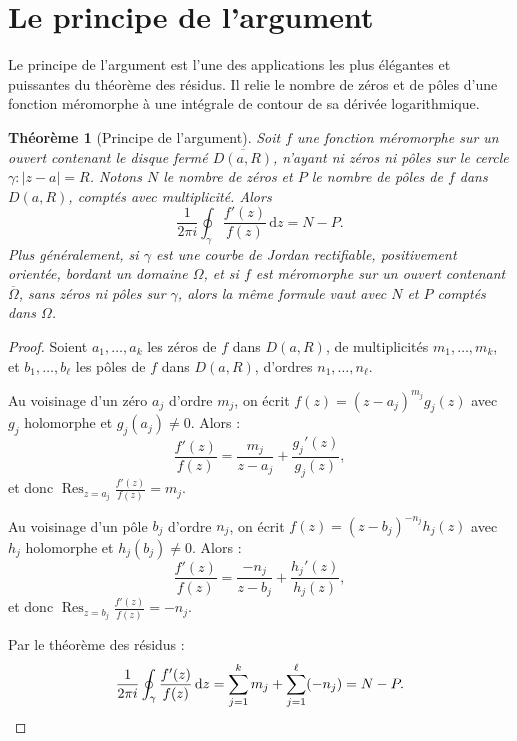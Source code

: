 \documentclass[12pt,a4paper,openany]{book}
\theoremstyle{definition}
\theoremstyle{plain}
\newtheorem{theoreme}[definition]{Théorème}
\theoremstyle{remark}
\DeclareMathOperator{\Res}{Res}
\newcommand{\dd}{\mathrm{d}}
\newcommand{\abs}[1]{\left|#1\right|}
\begin{document}
\section{Le principe de l'argument}\label{sec:principe-argument}

Le principe de l'argument est l'une des applications les plus élégantes et
puissantes du théorème des résidus. Il relie le nombre de zéros et de pôles
d'une fonction méromorphe à une intégrale de contour de sa dérivée logarithmique.

\begin{theoreme}[Principe de l'argument]\label{thm:principe-argument}
Soit $f$ une fonction méromorphe sur un ouvert contenant le disque fermé
$\overline{D(a,R)}$, n'ayant ni zéros ni pôles sur le cercle
$\gamma : \abs{z - a} = R$. Notons $N$ le nombre de zéros et $P$ le nombre de
pôles de $f$ dans $D(a,R)$, comptés avec multiplicité. Alors
\begin{equation}\label{eq:principe-argument}
  \frac{1}{2\pi i} \oint_{\gamma} \frac{f'(z)}{f(z)} \, \dd z = N - P.
\end{equation}
Plus généralement, si $\gamma$ est une courbe de Jordan rectifiable, positivement
orientée, bordant un domaine $\Omega$, et si $f$ est méromorphe sur un ouvert
contenant $\overline{\Omega}$, sans zéros ni pôles sur $\gamma$, alors la même
formule vaut avec $N$ et $P$ comptés dans $\Omega$.
\end{theoreme}

\begin{proof}
Soient $a_1, \ldots, a_k$ les zéros de $f$ dans $D(a,R)$, de multiplicités
$m_1, \ldots, m_k$, et $b_1, \ldots, b_\ell$ les pôles de $f$ dans $D(a,R)$,
d'ordres $n_1, \ldots, n_\ell$.

Au voisinage d'un zéro $a_j$ d'ordre $m_j$, on écrit $f(z) = (z - a_j)^{m_j}g_j(z)$
avec $g_j$ holomorphe et $g_j(a_j) \neq 0$. Alors :
\[
  \frac{f'(z)}{f(z)} = \frac{m_j}{z - a_j} + \frac{g_j'(z)}{g_j(z)},
\]
et donc $\Res_{z=a_j} \frac{f'(z)}{f(z)} = m_j$.

Au voisinage d'un pôle $b_j$ d'ordre $n_j$, on écrit
$f(z) = (z - b_j)^{-n_j} h_j(z)$ avec $h_j$ holomorphe et $h_j(b_j) \neq 0$. Alors :
\[
  \frac{f'(z)}{f(z)} = \frac{-n_j}{z - b_j} + \frac{h_j'(z)}{h_j(z)},
\]
et donc $\Res_{z=b_j} \frac{f'(z)}{f(z)} = -n_j$.

Par le théorème des résidus :
\[
  \frac{1}{2\pi i} \oint_{\gamma} \frac{f'(z)}{f(z)} \, \dd z
  = \sum_{j=1}^{k} m_j + \sum_{j=1}^{\ell} (-n_j)
  = N - P. \qedhere
\]
\end{proof}
\end{document}
